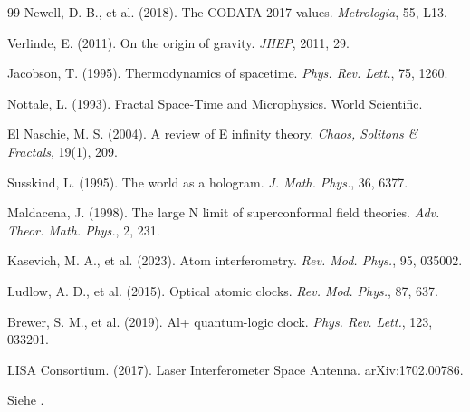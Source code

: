 \begin{thebibliography}{99}
		Newell, D. B., et al. (2018). The CODATA 2017 values. \emph{Metrologia}, 55, L13.
		
		Verlinde, E. (2011). On the origin of gravity. \emph{JHEP}, 2011, 29.
		
		Jacobson, T. (1995). Thermodynamics of spacetime. \emph{Phys. Rev. Lett.}, 75, 1260.
		
		Nottale, L. (1993). Fractal Space-Time and Microphysics. World Scientific.
		
		El Naschie, M. S. (2004). A review of E infinity theory. \emph{Chaos, Solitons \& Fractals}, 19(1), 209.
		
		Susskind, L. (1995). The world as a hologram. \emph{J. Math. Phys.}, 36, 6377.
		
		Maldacena, J. (1998). The large N limit of superconformal field theories. \emph{Adv. Theor. Math. Phys.}, 2, 231.
		
		Kasevich, M. A., et al. (2023). Atom interferometry. \emph{Rev. Mod. Phys.}, 95, 035002.
		
		Ludlow, A. D., et al. (2015). Optical atomic clocks. \emph{Rev. Mod. Phys.}, 87, 637.
		
		Brewer, S. M., et al. (2019). Al+ quantum-logic clock. \emph{Phys. Rev. Lett.}, 123, 033201.
		
		LISA Consortium. (2017). Laser Interferometer Space Antenna. arXiv:1702.00786.
		
		Siehe \cite{hundert1931}.
	\end{thebibliography}	